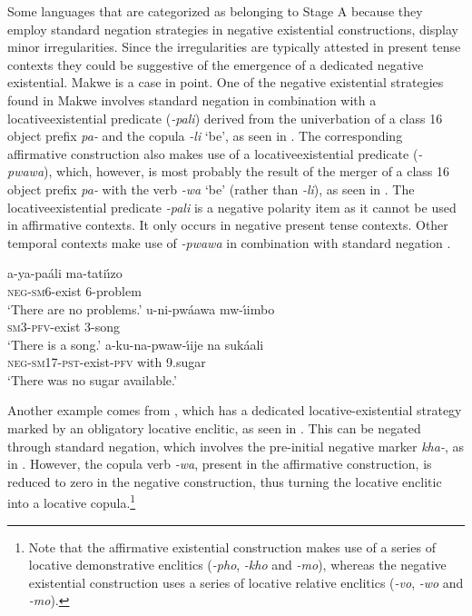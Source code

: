 \documentclass[output=paper,draft,draftmode,colorlinks,citecolor=brown]{langscibook}
\begin{document}
%
Some languages that are categorized as
belonging to Stage A because they employ standard negation strategies in
negative existential constructions, display minor irregularities. Since the
irregularities are typically attested in present tense contexts they could
be suggestive of the emergence of a dedicated negative existential.
Makwe is a case in point. One of the negative existential
strategies found in Makwe involves standard negation in combination with a
locative\textendash existential predicate (\textit{-pali}) derived from the
univerbation of a class 16 object prefix \textit{pa-} and the copula
\textit{-li} `be', as seen in .  The corresponding
affirmative construction also makes use of a locative\textendash existential
predicate (\textit{-pwawa}), which, however, is most probably the result of
the merger of a class 16 object prefix \textit{pa-} with the verb
\textit{-wa} `be' (rather than \textit{-li}), as seen in
.  The locative\textendash existential predicate
\textit{-pali} is a negative polarity item as it cannot be used in affirmative contexts. It only occurs in
negative present tense contexts. Other temporal contexts make use of
\textit{-pwawa} in combination with standard negation .
%

\ea\label{ex:makwe-problem-song-sugar} 

\ea\label{ex:makwe-problem}
\gll a-ya-paáli ma-tati{\'\i}zo\\ \textsc{neg-sm}6-exist 6-problem\\
\glt `There are no problems.' 
\ex\label{ex:makwe-song}
\gll u-ni-pwáawa
mw-{\'\i}imbo\\ \textsc{sm3-pfv}{}-exist  3-song\\
\glt `There is a song.'
\ex\label{ex:makwe-sugar}
\gll a-ku-na-pwaw-{\'\i}ije na sukáali\\
\textsc{neg-sm17-pst}-exist-\textsc{pfv} with 9.sugar\\
\glt `There was no
sugar available.'
\z
\z


%
Another example comes from , which
has a dedicated locative-ex\-is\-ten\-tial strategy marked by an obligatory
locative enclitic, as seen in . 
This can be negated through standard negation, which
involves the pre-initial negative marker \textit{kha-}, as in
. However, the copula verb \textit{-wa}, present in the
affirmative construction, is reduced to zero in the negative construction,
thus turning the locative enclitic into a locative copula.\footnote{Note
that the affirmative existential construction makes use of a series of
locative demonstrative enclitics (\textit{-pho}, \textit{-kho} and
\textit{-mo}), whereas the negative existential construction uses a series
of locative relative enclitics (\textit{-vo}, \textit{-wo} and
\textit{-mo}).} \ea\label{ex:shangaji-mosquito-star}
\end{document}

